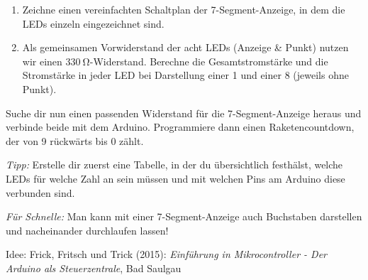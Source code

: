 \begin{aufgabe}
	\begin{enumerate}[label=\alph*), itemsep=0ex,parsep=0mm]
		\item Zeichne einen vereinfachten Schaltplan der 7-Segment-Anzeige, %
		in dem die LEDs einzeln eingezeichnet sind.
		\item Als gemeinsamen Vorwiderstand der acht LEDs (Anzeige \& Punkt) nutzen wir einen $\SI{330}{\ohm}$-Widerstand. Berechne die Gesamtstromstärke und die Stromstärke in jeder LED bei Darstellung einer 1 und einer 8 (jeweils ohne Punkt).
	\end{enumerate}
\end{aufgabe}

\begin{projekt}[Raketencountdown]\label{proj:raketencountdown}
	Suche dir nun einen passenden Widerstand für die 7-Segment-Anzeige heraus und verbinde beide mit dem Arduino. Programmiere dann einen Raketencountdown, der von 9 rückwärts bis 0 zählt.
	
	\emph{Tipp:} Erstelle dir zuerst eine Tabelle, in der du übersichtlich festhälst, welche LEDs für welche Zahl an sein müssen und mit welchen Pins am Arduino diese verbunden sind.
	
	\emph{Für Schnelle:} Man kann mit einer 7-Segment-Anzeige auch Buchstaben darstellen und nacheinander durchlaufen lassen!
	
	{\scriptsize Idee: Frick, Fritsch und Trick (2015): \emph{Einführung in Mikrocontroller - Der Arduino als Steuerzentrale}, Bad Saulgau}
\end{projekt}

%	

